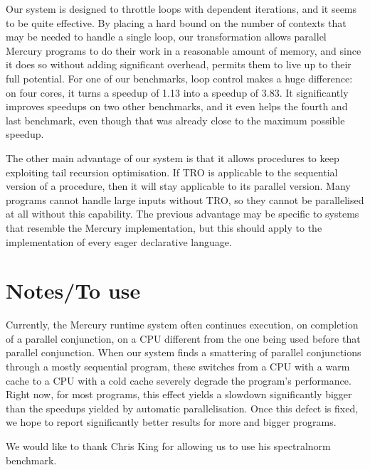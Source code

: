 Our system is designed to throttle loops with dependent iterations,
and it seems to be quite effective.
By placing a hard bound on the number of contexts
that may be needed to handle a single loop,
our transformation allows parallel Mercury programs
to do their work in a reasonable amount of memory,
and since it does so without adding significant overhead,
permits them to live up to their full potential.
For one of our benchmarks,
loop control makes a huge difference:
on four cores, it turns a speedup of 1.13 into a speedup of 3.83.
It significantly improves speedups on two other benchmarks,
and it even helps the fourth and last benchmark,
even though that was already close to the maximum possible speedup.

The other main advantage of our system
is that it allows procedures to keep exploiting tail recursion optimisation.
If TRO is applicable to the sequential version of a procedure,
then it will stay applicable to its parallel version.
Many programs cannot handle large inputs without TRO,
so they cannot be parallelised at all without this capability.
The previous advantage may be specific
to systems that resemble the Mercury implementation,
but this should apply to the implementation
of every eager declarative language.

\section{Notes/To use}


Currently, the Mercury runtime system
often continues execution, on completion of a parallel conjunction,
on a CPU different from the one being used before that parallel conjunction.
When our system finds a smattering of parallel conjunctions
through a mostly sequential program,
these switches from a CPU with a warm cache to a CPU with a cold cache
severely degrade the program's performance.
Right now, for most programs,
this effect yields a slowdown significantly bigger
than the speedups yielded by automatic parallelisation.
Once this defect is fixed, we hope to report significantly better results
for more and bigger programs.



We would like to thank
Chris King for allowing us to use his spectralnorm benchmark.


